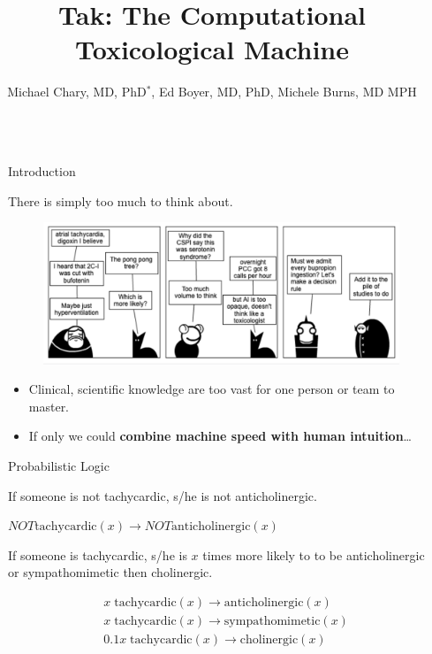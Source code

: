 \documentclass[final]{beamer}
\title{Tak: The Computational Toxicological Machine}
\author{Michael Chary, MD, PhD$^*$, Ed Boyer, MD, PhD, Michele Burns, MD MPH}
\institute[BCH Tox]{Division of Toxicology, Boston Children's Hospital}
\newlength{\sepwidth}
\newlength{\colwidth}
\newcommand{\separatorcolumn}{\begin{column}{\sepwidth}\end{column}}
\begin{document}
\begin{frame}[t]
\begin{columns}[t]
\separatorcolumn

\begin{column}{\colwidth}

  \begin{block}{Introduction}

    There is simply too much to think about. 

    \begin{figure}
   \includegraphics[scale=0.65]{./acmt-intro.png}
   \end{figure}

     \begin{itemize}
      \item[] Clinical, scientific knowledge are too vast for one person or team to master.
      \item[] If only we could  \textbf{combine machine speed with human intuition}\ldots  
    \end{itemize}
  \end{block}


  \begin{alertblock}{Probabilistic Logic}
   
         If someone is not tachycardic, s/he is not anticholinergic. 
       
      $NOT \textrm{tachycardic}\left(x\right) \rightarrow NOT \textrm{anticholinergic}\left(x\right)$
      
      \vspace{1em}
      If someone is tachycardic, s/he is $x$ times more likely to to be anticholinergic or sympathomimetic then cholinergic. 
      
       \begin{align*}
                 & 	x\;  \textrm{tachycardic}\left(x\right) \rightarrow \textrm{anticholinergic}\left(x\right)\\
            	& x \; \textrm{tachycardic}\left(x\right) \rightarrow \textrm{sympathomimetic}\left(x\right)\\
            	& 0.1x \; \textrm{tachycardic}\left(x\right) \rightarrow \textrm{cholinergic}\left(x\right)\\
      \end{align*}


\end{alertblock}
\end{column}
\end{columns}
\end{frame}
\end{document}
